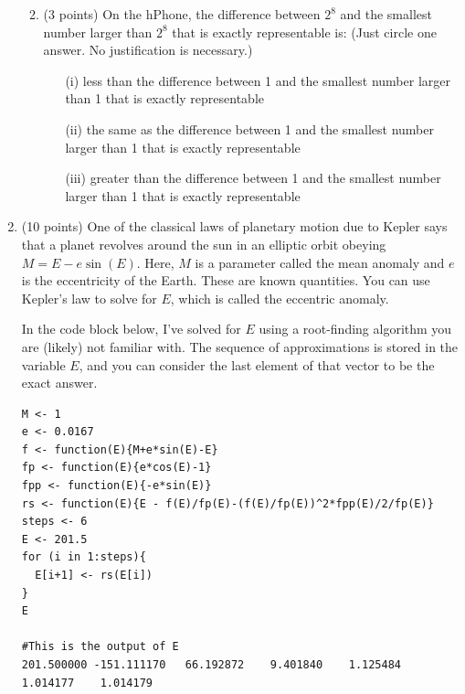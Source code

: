 \documentclass[12point]{article}
\begin{document}
\begin{enumerate}
\begin{enumerate}
\vspace{2in}


\item (3 points)
On the hPhone, the difference between $2^8$ and the smallest number larger than $2^8$ that is exactly representable is: (Just circle one answer. No justification is necessary.)
\medskip

\begin{itemize}
\item[(i)] less than the difference between 1 and the smallest number larger than 1 that is exactly representable
\item[(ii)] the same as the difference between 1 and the smallest number larger than 1 that is exactly representable
\item[(iii)] greater than the difference between 1 and the smallest number larger than 1 that is exactly representable
\end{itemize}
\end{enumerate}  


\newpage






\newpage

\item (10 points) One of the classical laws of planetary motion due to Kepler says that a planet revolves around the sun in an elliptic orbit obeying $M=E-e\sin(E)$. Here, $M$ is a parameter called the mean anomaly and $e$ is the eccentricity of the Earth. These are known quantities. You can use Kepler's law to solve for $E$, which is called the eccentric anomaly.

In the code block below, I've solved for $E$ using a root-finding algorithm you are (likely) not familiar with. The sequence of approximations is stored in the variable $E$, and you can consider the last element of that vector to be the exact answer.

\begin{verbatim}
M <- 1
e <- 0.0167
f <- function(E){M+e*sin(E)-E}
fp <- function(E){e*cos(E)-1}
fpp <- function(E){-e*sin(E)}
rs <- function(E){E - f(E)/fp(E)-(f(E)/fp(E))^2*fpp(E)/2/fp(E)}
steps <- 6
E <- 201.5
for (i in 1:steps){
  E[i+1] <- rs(E[i])
}
E

#This is the output of E
201.500000 -151.111170   66.192872    9.401840    1.125484    1.014177    1.014179 
\end{verbatim}


\end{enumerate}
\end{document}
